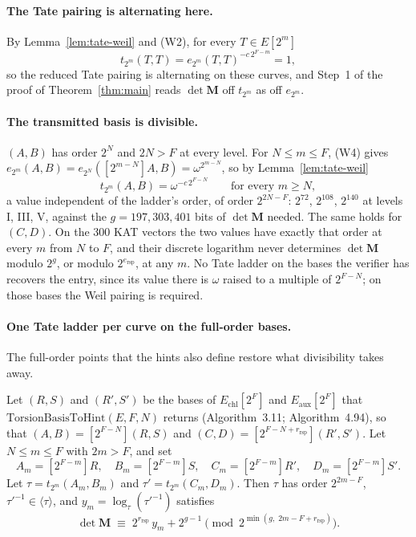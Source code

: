 \documentclass[version=submission]{iacrcc}
\newcommand{\ers}{e_{\mathrm{rsp}}}
\newcommand{\rrs}{r_{\mathrm{rsp}}}
\newcommand{\Mm}{\mathbf{M}}
\begin{document}
\paragraph{The Tate pairing is alternating here.}
By Lemma~\ref{lem:tate-weil} and (W2), for every $T \in E[2^m]$
\[
  t_{2^m}(T, T) = e_{2^m}(T, T)^{-c\, 2^{F - m}} = 1,
\]
so the reduced Tate pairing is alternating on these curves, and Step~1
of the proof of Theorem~\ref{thm:main} reads $\det \Mm$ off $t_{2^m}$ as
off $e_{2^m}$.

\paragraph{The transmitted basis is divisible.}
$(A, B)$ has order $2^N$ and $2 N > F$ at every level. For $N \le m \le
F$, (W4) gives $e_{2^m}(A, B) = e_{2^N}([2^{m - N}] A, B) = \omega^{2^{m -
N}}$, so by Lemma~\ref{lem:tate-weil}
\[
  t_{2^m}(A, B) = \omega^{-c\, 2^{F - N}} \qquad \text{for every } m \ge N,
\]
a value independent of the ladder's order, of order $2^{2N - F}$: $2^{72}$,
$2^{108}$, $2^{140}$ at levels I, III, V, against the $g = 197, 303, 401$
bits of $\det \Mm$ needed. The same holds for $(C, D)$. On the 300 KAT
vectors the two values have exactly that order at every $m$ from $N$ to
$F$, and their discrete logarithm never determines $\det \Mm$ modulo
$2^g$, or modulo $2^{\ers}$, at any $m$. No Tate ladder on the bases the verifier has recovers the entry, since its value there is $\omega$ raised to a multiple of $2^{F - N}$; on those bases the Weil pairing is required.

\paragraph{One Tate ladder per curve on the full-order bases.}
The full-order points that the hints also define restore what divisibility takes away.

\begin{proposition}\label{prop:tate}
Let $(R,S)$ and $(R',S')$ be the bases of $E_{\mathrm{chl}}[2^F]$ and
$E_{\mathrm{aux}}[2^F]$ that $\mathrm{TorsionBasisToHint}(E, F, N)$
returns (Algorithm~3.11; Algorithm~4.94), so that $(A, B) = [2^{F - N}]
(R, S)$ and $(C, D) = [2^{F - N + \rrs}] (R', S')$. Let $N \le m \le F$
with $2m > F$, and set
\[
  A_m = [2^{F-m}]R,\quad B_m = [2^{F-m}]S,\quad
  C_m = [2^{F-m}]R',\quad D_m = [2^{F-m}]S'.
\]
Let $\tau = t_{2^m}(A_m, B_m)$ and $\tau' = t_{2^m}(C_m, D_m)$. Then $\tau$ has order
$2^{2m-F}$, $\tau'^{-1} \in \langle \tau \rangle$, and $y_m = \log_\tau(\tau'^{-1})$ satisfies
\[
  \det \Mm \;\equiv\; 2^{\rrs}\, y_m + 2^{g - 1} \pmod{2^{\min(g,\; 2m - F + \rrs)}} .
\]
\end{proposition}
\end{document}
